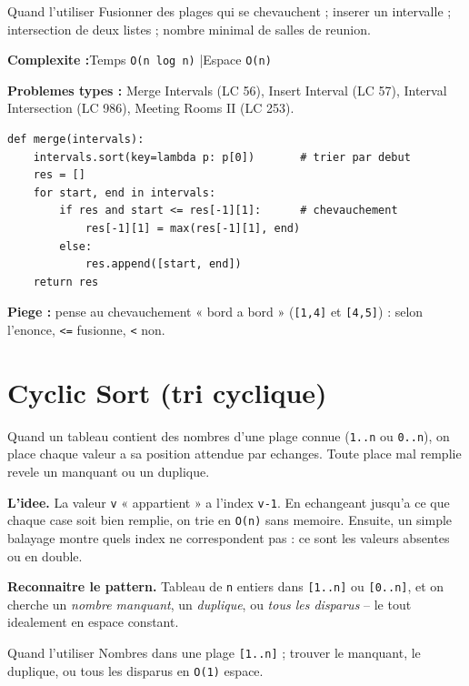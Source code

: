 \documentclass[11pt,a4paper]{article}
\newcommand{\complexite}[2]{%
  \noindent\textbf{Complexite :}\quad Temps \texttt{#1} \quad|\quad Espace \texttt{#2}\par\smallskip}
\newcommand{\leetcode}[1]{\noindent\textbf{Problemes types :} #1\par\medskip}
\begin{document}
\begin{infobox}{Quand l'utiliser}
Fusionner des plages qui se chevauchent ; inserer un intervalle ; intersection de
deux listes ; nombre minimal de salles de reunion.
\end{infobox}

\complexite{O(n log n)}{O(n)}
\leetcode{Merge Intervals (LC 56), Insert Interval (LC 57), Interval Intersection (LC 986), Meeting Rooms II (LC 253).}

\begin{lstlisting}
def merge(intervals):
    intervals.sort(key=lambda p: p[0])       # trier par debut
    res = []
    for start, end in intervals:
        if res and start <= res[-1][1]:      # chevauchement
            res[-1][1] = max(res[-1][1], end)
        else:
            res.append([start, end])
    return res
\end{lstlisting}

\textbf{Piege :} pense au chevauchement « bord a bord » (\texttt{[1,4]} et
\texttt{[4,5]}) : selon l'enonce, \texttt{<=} fusionne, \texttt{<} non.

\section{Cyclic Sort (tri cyclique)}
Quand un tableau contient des nombres d'une plage connue (\texttt{1..n} ou
\texttt{0..n}), on place chaque valeur a sa position attendue par echanges. Toute
place mal remplie revele un manquant ou un duplique.

\textbf{L'idee.} La valeur \texttt{v} « appartient » a l'index \texttt{v-1}. En
echangeant jusqu'a ce que chaque case soit bien remplie, on trie en \texttt{O(n)}
sans memoire. Ensuite, un simple balayage montre quels index ne correspondent
pas : ce sont les valeurs absentes ou en double.

\textbf{Reconnaitre le pattern.} Tableau de \texttt{n} entiers dans \texttt{[1..n]}
ou \texttt{[0..n]}, et on cherche un \emph{nombre manquant}, un \emph{duplique},
ou \emph{tous les disparus} -- le tout idealement en espace constant.

\begin{infobox}{Quand l'utiliser}
Nombres dans une plage \texttt{[1..n]} ; trouver le manquant, le duplique, ou tous
les disparus en \texttt{O(1)} espace.
\end{infobox}
\end{document}
